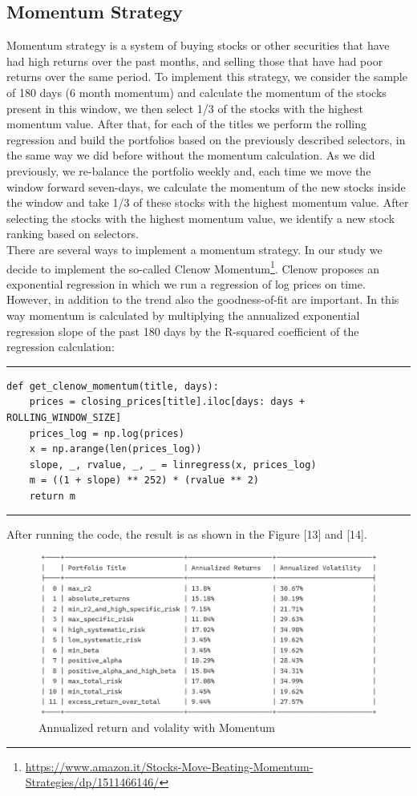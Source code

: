 \documentclass[twocolumn]{article}
\begin{document}
\subsection{Momentum Strategy}
Momentum strategy is a system of buying stocks or other securities that have had high returns over the past months, and selling those that have had poor returns over the same period.
To implement this strategy, we consider the sample of 180 days (6 month momentum) and calculate the momentum of the stocks present in this window, we then select 1/3 of the stocks with the highest momentum value. After that, for each of the titles we perform the rolling regression and build the portfolios based on the previously described selectors, in the same way we did before without the momentum calculation. As we did previously, we re-balance the portfolio weekly and, each time we move the window forward seven-days, we calculate the momentum of the new stocks inside the window and take 1/3 of these stocks with the highest momentum value. After selecting the stocks with the highest momentum value, we identify a new stock ranking based on selectors. \\There are several ways to implement a momentum strategy. In our study we decide to implement the so-called Clenow Momentum\footnote{\url{https://www.amazon.it/Stocks-Move-Beating-Momentum-Strategies/dp/1511466146/}}. Clenow proposes an exponential regression in which we run a regression of log prices on time. However, in addition to the trend also the goodness-of-fit are important. In this way momentum is calculated by multiplying the annualized exponential regression slope of the past 180 days by the R-squared coefficient of the regression calculation:
\rule{\linewidth}{0.4pt}
\vspace{-5 mm}
\begin{verbatim}
def get_clenow_momentum(title, days):
    prices = closing_prices[title].iloc[days: days + ROLLING_WINDOW_SIZE]
    prices_log = np.log(prices)
    x = np.arange(len(prices_log))
    slope, _, rvalue, _, _ = linregress(x, prices_log)
    m = ((1 + slope) ** 252) * (rvalue ** 2)
    return m
\end{verbatim}
\vspace{-3 mm}
\rule{\linewidth}{0.4pt}
After running the code, the result is as shown in the Figure [13] and [14].
\begin{figure}[t]
\centering\includegraphics[scale=0.5]{momentumBase.png}
\caption{Annualized return and volality with Momentum}
\end{figure}
\end{document}
